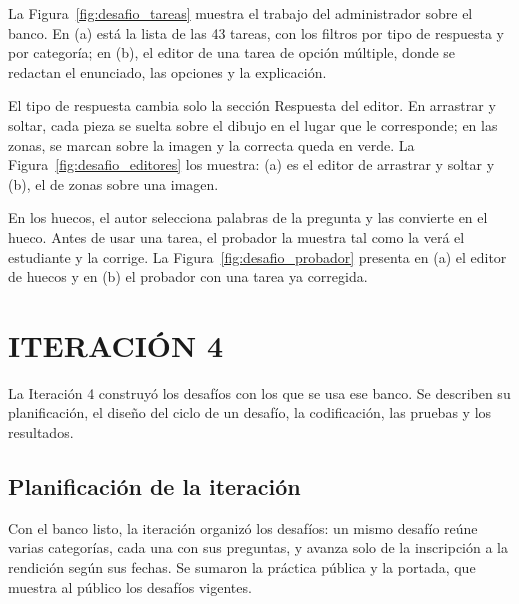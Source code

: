 La Figura~\ref{fig:desafio_tareas} muestra el trabajo del administrador sobre el banco. En (a) está la lista de las 43 tareas, con los filtros por tipo de respuesta y por categoría; en (b), el editor de una tarea de opción múltiple, donde se redactan el enunciado, las opciones y la explicación.


El tipo de respuesta cambia solo la sección Respuesta del editor. En arrastrar y soltar, cada pieza se suelta sobre el dibujo en el lugar que le corresponde; en las zonas, se marcan sobre la imagen y la correcta queda en verde. La Figura~\ref{fig:desafio_editores} los muestra: (a) es el editor de arrastrar y soltar y (b), el de zonas sobre una imagen.


En los huecos, el autor selecciona palabras de la pregunta y las convierte en el hueco. Antes de usar una tarea, el probador la muestra tal como la verá el estudiante y la corrige. La Figura~\ref{fig:desafio_probador} presenta en (a) el editor de huecos y en (b) el probador con una tarea ya corregida.


\section{ITERACIÓN 4}

La Iteración 4 construyó los desafíos con los que se usa ese banco. Se describen su planificación, el diseño del ciclo de un desafío, la codificación, las pruebas y los resultados.

\subsection{Planificación de la iteración}

Con el banco listo, la iteración organizó los desafíos: un mismo desafío reúne varias categorías, cada una con sus preguntas, y avanza solo de la inscripción a la rendición según sus fechas. Se sumaron la práctica pública y la portada, que muestra al público los desafíos vigentes.

